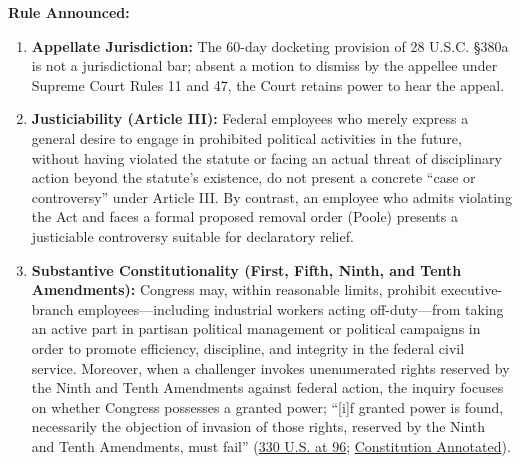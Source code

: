 \documentclass[12pt]{article}
\begin{document}
\textbf{Rule Announced:}
\begin{enumerate}
\item \textbf{Appellate Jurisdiction:} The 60-day docketing provision of 28 U.S.C. \S 380a is not a jurisdictional bar; absent a motion to dismiss by the appellee under Supreme Court Rules 11 and 47, the Court retains power to hear the appeal.
\item \textbf{Justiciability (Article III):} Federal employees who merely express a general desire to engage in prohibited political activities in the future, without having violated the statute or facing an actual threat of disciplinary action beyond the statute's existence, do not present a concrete ``case or controversy'' under Article III. By contrast, an employee who admits violating the Act and faces a formal proposed removal order (Poole) presents a justiciable controversy suitable for declaratory relief.
\item \textbf{Substantive Constitutionality (First, Fifth, Ninth, and Tenth Amendments):} Congress may, within reasonable limits, prohibit executive-branch employees---including industrial workers acting off-duty---from taking an active part in partisan political management or political campaigns in order to promote efficiency, discipline, and integrity in the federal civil service. Moreover, when a challenger invokes unenumerated rights reserved by the Ninth and Tenth Amendments against federal action, the inquiry focuses on whether Congress possesses a granted power; ``[i]f granted power is found, necessarily the objection of invasion of those rights, reserved by the Ninth and Tenth Amendments, must fail'' (\href{https://www.law.cornell.edu/supremecourt/text/330/75}{330 U.S. at 96}; \href{https://constitution.congress.gov/browse/essay/amdt9-3/ALDE_00013643/}{Constitution Annotated}).
\end{enumerate}
\end{document}
